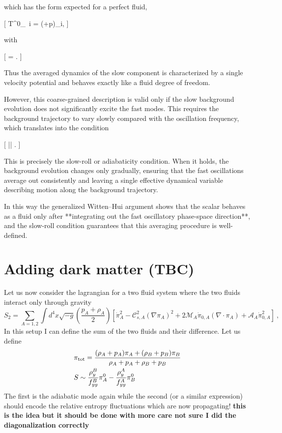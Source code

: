 which has the form expected for a perfect fluid,

[
T^0_{\ i} = (\rho+p)\partial_i\theta,
]

with

[
\theta = .
]

Thus the averaged dynamics of the slow component is characterized by a single velocity potential and behaves exactly like a fluid degree of freedom.

However, this coarse-grained description is valid only if the slow background evolution does not significantly excite the fast modes. This requires the background trajectory to vary slowly compared with the oscillation frequency, which translates into the condition

[
\left|\right|  .
]

This is precisely the slow-roll or adiabaticity condition. When it holds, the background evolution changes only gradually, ensuring that the fast oscillations average out consistently and leaving a single effective dynamical variable describing motion along the background trajectory.

In this way the generalized Witten–Hui argument shows that the scalar behaves as a fluid only after **integrating out the fast oscillatory phase-space direction**, and the slow-roll condition guarantees that this averaging procedure is well-defined.



\section{Adding dark matter (TBC)}

Let us now consider the lagrangian for a two fluid system where the two fluids interact only through gravity 
\begin{equation}
S_2=\sum_{A=1,2}\int d^4x\sqrt{-g}\left(\frac{p_A+\rho_A}{2}\right)\left[\dot\pi_A^2-\mathcal{C}_{s,A}^2(\nabla\pi_A)^2+2\mathcal{M}_A\dot{\pi}_{0,A} (\nabla\!\!\cdot\!\pi_A)+\mathcal{A}_A \dot{\pi}_{0,A}^2\right]\ , 
\end{equation}   
In this setup I can define the sum of the two fluids and their difference. Let us define 
\begin{align}
&\pi_{\rm{tot}}=\frac{(\rho_A+p_A)\pi_A+(\rho_B+p_B)\pi_B}{\rho_A+p_A+\rho_B+p_B}\\
&S\sim\frac{\rho^B_y}{f^B_{yy}} \pi^0_A-\frac{\rho_y^A}{f^A_{yy}} \pi^0_B
\end{align}
The first is the adiabatic mode again while the second (or a similar expression) should encode the relative entropy fluctuations which are now propagating! {\bf this is the idea but it should be done with more care not sure I did the diagonalization correctly}
